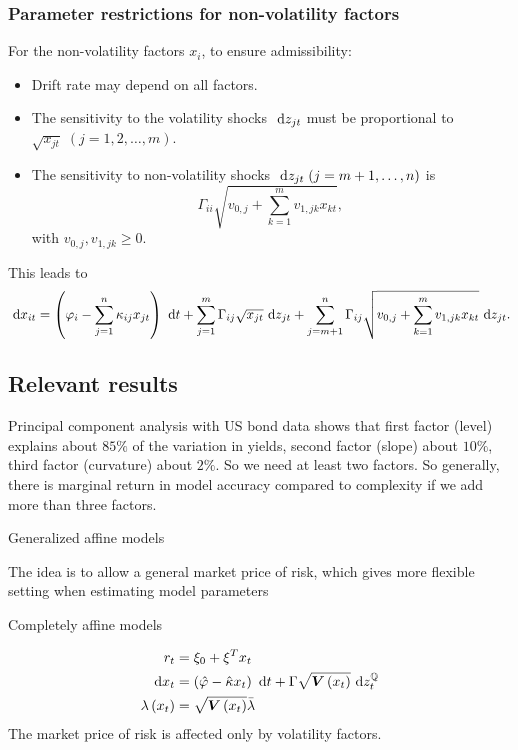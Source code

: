 \subsubsection{Parameter restrictions for non-volatility factors}
For the non-volatility factors $x_i$, to ensure admissibility:
\begin{itemize}
  \item Drift rate may depend on all factors.
  \item The sensitivity to the volatility shocks $\text{ d}  z_{j t}$ must be proportional to $\sqrt{x_{j
    t}}\; (j= 1,2, \ldots, m)$.
  \item The sensitivity to non-volatility shocks $\text{ d}  z_{j t}\; (j=m+1, \ldots, n)$ is
    \[
      \Gamma_{i i} \sqrt{v_{0, j}+\sum_{k=1}^{m} v_{1, j k} x_{k t}} \text {, }
    \]
    with $v_{0, j}, v_{1, j k} \geq 0$.
\end{itemize}
This leads to
\[
\text{ d}  x_{i t}=\left(\varphi_{i}-\sum_{j=1}^{n} \kappa_{i j} x_{j t}\right) \text{ d}  t+\sum_{j=1}^{m}
\Gamma_{i j} \sqrt{x_{j t}} \text{ d}  z_{j t}+\sum_{j=m+1}^{n} \Gamma_{i j} \sqrt{v_{0, j}+\sum_{k=1}^{m}
v_{1, j k} x_{k t}} \text{ d}  z_{j t} .
\]

\subsection{Relevant results}

Principal component analysis with US bond data shows
that first factor (level) explains about $85 \%$ of the variation in yields, second factor (slope)
about $10 \%$, third factor (curvature) about $2 \%$. So we need at least two factors. So generally,
there is marginal return in model accuracy compared to complexity if we add more than three
factors.

\begin{description}
\item[Generalized affine models] 
\end{description}
 The idea is to allow a general market price of risk, which gives more flexible setting when
 estimating model parameters

 \begin{description}
   \item[Completely affine models]
 \end{description}
\[
\begin{aligned}
r_{t} & =\xi_{0}+\xi^{T} x_{t} \\
\text{ d}  x_{t} & =\left(\hat{\varphi}-\hat{\kappa} x_{t}\right) \text{ d}  t+\Gamma \sqrt{\boldsymbol{V}\left(x_{t}\right)} \text{ d}  z_{t}^{\mathbb{Q}} \\
\lambda\left(x_{t}\right) & =\sqrt{\boldsymbol{V}\left(x_{t}\right)} \bar{\lambda}
\end{aligned}
\]
The market price of risk is affected only by volatility factors.

